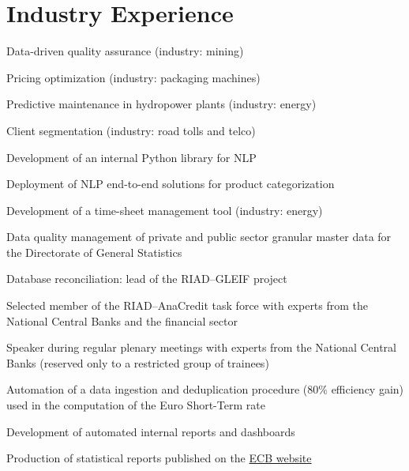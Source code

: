 \documentclass[]{deedy-resume-reversed}
\begin{document}
\begin{minipage}[t]{0.60\textwidth}

\section{Industry Experience}

\begin{tightemize}
\item Data-driven quality assurance (industry: mining)
\item Pricing optimization (industry: packaging machines)
\item Predictive maintenance in hydropower plants (industry: energy)
\item Client segmentation (industry: road tolls and telco) 
\item Development of an internal Python library for NLP
\item Deployment of NLP end-to-end solutions for product categorization
\end{tightemize}
\sectionsep

\begin{tightemize}
\item Development of a time-sheet management tool (industry: energy)
\end{tightemize}
\sectionsep

\begin{tightemize}
\item Data quality management of private and public sector granular master data for the Directorate of General Statistics
\item Database reconciliation: lead of the RIAD–GLEIF project
\item Selected member of the RIAD–AnaCredit task force with experts from the National Central Banks and the financial sector
\item Speaker during regular plenary meetings with experts from the National Central Banks (reserved only to a restricted group of trainees)
\item Automation of a data ingestion and deduplication procedure (80\% efficiency gain) used in the computation of the Euro Short-Term rate
\item Development of automated internal reports and dashboards
\item Production of statistical reports published on the \href{https://www.ecb.europa.eu/stats/financial_corporations/list_of_financial_institutions/html/index.en.html}{ECB website}
\end{tightemize}
\sectionsep



\end{minipage}
\end{document}
